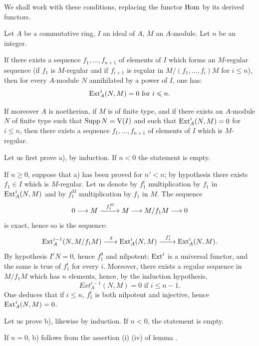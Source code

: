 We shall work with these conditions, replacing the
functor \(\operatorname{Hom}\) by its derived functors.

\begin{theorem} \label{III.2.2}
Let \(A\) be a commutative ring, \(I\) an ideal of \(A\), \(M\) an
\(A\)-module. Let \(n\) be an integer.

\begin{enumeratea}
\item
If there exists a sequence \(f_1, \ldots, f_{n+1}\) of elements of
\(I\) which forms an \(M\)-regular sequence (\ie if \(f_1\) is
\(M\)-regular and if \(f_{i+1}\) is regular in
\(M/(f_1, \ldots, f_i)M\) for \(i\leq n\)), then for every
\(A\)-module \(N\) annihilated by a power of \(I\), one has:
\[
\operatorname{Ext}_A^i(N, M)=0 \text{ for } i\leqslant n.
\]

\item
If moreover \(A\) is noetherian, if \(M\) is of finite type, and if
there exists an \(A\)-module \(N\) of finite type such that
\(\operatorname{Supp} N = \operatorname{V}(I)\) and such that \(\operatorname{Ext}_A^i(N, M)=0\) for
\(i\leq n\), then there exists a sequence \(f_1, \ldots, f_{n+1}\) of
elements of \(I\) which is \(M\)-regular.
\end{enumeratea}
\end{theorem}

Let us first prove a), by induction. If \(n<0\) the statement is empty.

If \(n\geq 0\), suppose that a) has been proved for \(n'<n\); by
hypothesis there exists \(f_1\in I\) which is \(M\)-regular. Let us
denote by \(f_1^i\) multiplication by \(f_1\) in \(\operatorname{Ext}_A^i(N, M)\) and
by \(f_1^M\) multiplication by \(f_1\) in \(M\). The sequence
\begin{equation} \label{eq:III.2.1}
0 \to M \lto{f_1^M} M \to M/f_1M \to 0
\end{equation}
is exact, hence so is the sequence:
\[
\Ext_A^{i-1} (N, M/f_1M) \lto{\delta}\Ext_A^i (N, M) \lto{f_1^i} \Ext_A^i (N, M).
\]
By hypothesis \(I^rN=0\), hence \(f_1^0\) and nilpotent; \(\operatorname{Ext}^i\) is
a universal functor, and the same is true of \(f_1^i\) for every \(i\).
Moreover, there exists a regular sequence in \(M/f_1 M\) which has \(n\)
elements, hence, by the induction hypothesis,
\[
Ext_A^{i-1}(N, M)=0 \text{ if } i\leq n-1.
\]
One deduces that if \(i\leq n\), \(f_1^i\) is both nilpotent and
injective, hence \(\operatorname{Ext}_A^i(N, M)=0\).

Let us prove b), likewise by induction. If \(n<0\), the statement is
empty.

If \(n=0\), b) follows from the assertion (i) \ALORS (iv) of lemma
.

